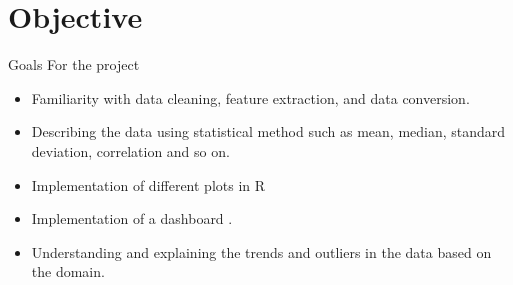 \documentclass{beamer}
\begin{document}
	\section{Objective}
	\begin{frame}{Goals For the project}
		\begin{itemize}
			\item Familiarity with data cleaning, feature extraction, and data conversion.
			
			\item Describing the data using statistical method such as mean, median, standard deviation, correlation and so on.
			
			\item Implementation of different plots in R
			
			\item Implementation of a dashboard .
			
			\item Understanding and explaining the trends and outliers in the data based on the domain.
			
		\end{itemize}
	\end{frame}
	
\end{document}
